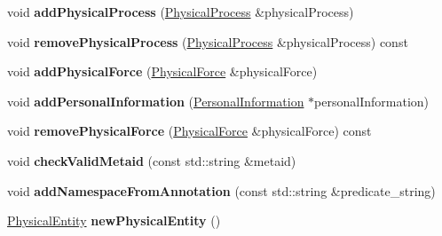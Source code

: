 \begin{DoxyCompactItemize}
\item 
\mbox{\label{classomexmeta_1_1Editor_ae4a608ecbe64f05c1b64efbeeb1fdeb1}} 
void {\bfseries add\+Physical\+Process} (\hyperlink{classomexmeta_1_1PhysicalProcess}{Physical\+Process} \&physical\+Process)
\item 
\mbox{\label{classomexmeta_1_1Editor_a42640d74c6afe780738c906bdf346a78}} 
void {\bfseries remove\+Physical\+Process} (\hyperlink{classomexmeta_1_1PhysicalProcess}{Physical\+Process} \&physical\+Process) const
\item 
\mbox{\label{classomexmeta_1_1Editor_a7833e03995f6323109c2db8d59104f6c}} 
void {\bfseries add\+Physical\+Force} (\hyperlink{classomexmeta_1_1PhysicalForce}{Physical\+Force} \&physical\+Force)
\item 
\mbox{\label{classomexmeta_1_1Editor_a1b2e0f5859fe2e2784ecff2a78f7f1f8}} 
void {\bfseries add\+Personal\+Information} (\hyperlink{classomexmeta_1_1PersonalInformation}{Personal\+Information} $\ast$personal\+Information)
\item 
\mbox{\label{classomexmeta_1_1Editor_ad99187ec52bef1af440af5d9560f32c5}} 
void {\bfseries remove\+Physical\+Force} (\hyperlink{classomexmeta_1_1PhysicalForce}{Physical\+Force} \&physical\+Force) const
\item 
\mbox{\label{classomexmeta_1_1Editor_a790458ef32f01ce0a6fd87bf14bed81a}} 
void {\bfseries check\+Valid\+Metaid} (const std\+::string \&metaid)
\item 
\mbox{\label{classomexmeta_1_1Editor_a3fef7f1c38949b50239a9a07cc327d67}} 
void {\bfseries add\+Namespace\+From\+Annotation} (const std\+::string \&predicate\+\_\+string)
\item 
\mbox{\label{classomexmeta_1_1Editor_a245b2105c175892d1fddaf693fa9d636}} 
\hyperlink{classomexmeta_1_1PhysicalEntity}{Physical\+Entity} {\bfseries new\+Physical\+Entity} ()
\item 
\mbox{\label{classomexmeta_1_1Editor_a58d21ef09f3dc5a6a66dbafe34150695}} 

\end{DoxyCompactItemize}

